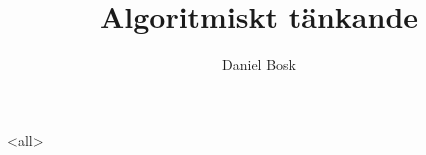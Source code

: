 \documentclass[ignoreframetext]{beamer}
\begin{document}
\title{%
  Algoritmiskt tänkande
}
\author{Daniel Bosk}

\begin{frame}
  \maketitle
\end{frame}

\mode<all>

\mode*
%

\end{document}
